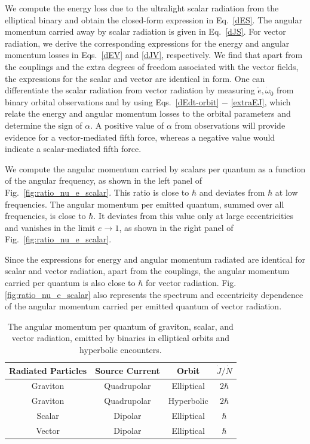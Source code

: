 \documentclass[aps,prd]{revtex4-2}
\begin{document}
We compute the energy loss due to the ultralight scalar radiation from the elliptical binary and obtain the closed-form expression in Eq.~\eqref{dES}. The angular momentum carried away by scalar radiation is given in Eq.~\eqref{dJS}. For vector radiation, we derive the corresponding expressions for the energy and angular momentum losses in Eqs.~\eqref{dEV} and \eqref{dJV}, respectively. We find that apart from the couplings and the extra degrees of freedom associated with the vector fields, the expressions for the scalar and vector are identical in form. One can differentiate the scalar radiation from vector radiation by measuring  $\dot e, \dot \omega_{0}$ from binary orbital observations and by using Eqs.~\eqref{dEdt-orbit} $-$ \eqref{extraEJ}, which relate the energy and angular momentum losses to the orbital parameters and determine the sign of $\alpha$. A positive value of $\alpha$ from observations will provide evidence for a vector-mediated fifth force, whereas a negative value would indicate a scalar-mediated fifth force.


We compute the angular momentum carried by scalars per quantum as a function of the angular frequency, as shown in the left panel of Fig.~\ref{fig:ratio_nu_e_scalar}. This ratio is close to $\hbar$ and deviates from $\hbar$ at low frequencies. The angular momentum per emitted quantum, summed over all frequencies, is close to $\hbar$. It deviates from this value only at large eccentricities and vanishes in the limit $e \to 1$, as shown in the right panel of Fig.~\ref{fig:ratio_nu_e_scalar}. 

Since the expressions for energy and angular momentum radiated are identical for scalar and vector radiation, apart from the couplings, the angular momentum carried per quantum is also close to $\hbar$ for vector radiation. Fig.~ \ref{fig:ratio_nu_e_scalar} also represents the spectrum and eccentricity dependence of the angular momentum carried per emitted quantum of vector radiation. 



\begin{table}[h!]
\centering
\begin{tabular}{||c || c || c || c||} 
 \hline
 Radiated Particles & Source Current & Orbit & $\dot{J}/\dot{N}$ \\ [0.5ex] 
 \hline\hline
Graviton & Quadrupolar & Elliptical & $2\hbar$ \\ \hline
Graviton & Quadrupolar & Hyperbolic & $2\hbar$ \\ \hline
Scalar   & Dipolar     & Elliptical & $\hbar$ \\ \hline
Vector   & Dipolar     & Elliptical & $\hbar$ \\ [1ex] 
 \hline\hline
\end{tabular}
\caption{The angular momentum per quantum of graviton, scalar, and vector radiation, emitted by binaries in elliptical orbits and hyperbolic encounters.}
\label{table:1}
\end{table}
\end{document}
